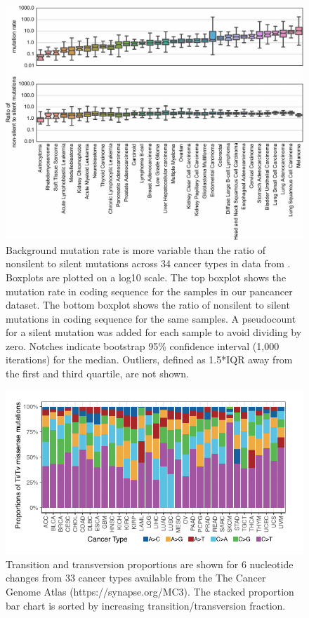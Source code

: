 \begin{figure}
  \centering
  \makeatletter
  \let\@currsize\normalsize
  \includegraphics[width=0.9\linewidth]{figures/chapter2/mut_rate_and_ratiometric.jpg}
  \caption[]{Background mutation rate is more variable than the ratio of nonsilent to silent mutations across 34 cancer types in data from \cite{RN14, RN71}. Boxplots are plotted on a log10 scale. The top boxplot shows the mutation rate in coding sequence for the samples in our pancancer dataset. The bottom boxplot shows the ratio of nonsilent to silent mutations in coding sequence for the same samples. A pseudocount for a silent mutation was added for each sample to avoid dividing by zero. Notches indicate bootstrap 95\% confidence interval (1,000 iterations) for the median. Outliers, defined as 1.5*IQR away from the first and third quartile, are not shown.}
  \label{fig:mut_rate_variability}
\end{figure}

\begin{figure}
  \centering
  \makeatletter
  \let\@currsize\normalsize
  \includegraphics[width=0.9\linewidth]{figures/chapter2/mutation_context.pdf}
  \caption[]{Transition and transversion proportions are shown for 6 nucleotide changes from 33 cancer types available from the The Cancer Genome Atlas (https://synapse.org/MC3). The stacked proportion bar chart is sorted by increasing transition/transversion fraction.}
  \label{fig:mutation_context}
\end{figure}


